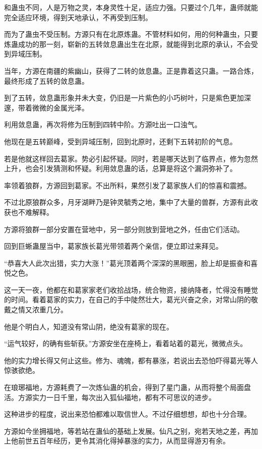 \begin{this_body}
和蛊虫不同，人是万物之灵，本身灵性十足，适应力强。只要过个几年，蛊师就能完全适应环境，得到天地承认，不再受到压制。

而为了蛊虫不受压制。方源只有在北原炼蛊。不管材料如何，用的何种蛊虫，只要炼蛊成功的那一刻，崭新的五转敛息蛊出生在北原，就能得到北原的承认，不会受到异域压制。

当年，方源在南疆的紫幽山，获得了二转的敛息蛊。正是靠着这只蛊。一路合炼，最终形成了五转的敛息蛊。

到了五转，敛息蛊形象并未大变，仍旧是一片紫色的小巧树叶，只是紫色更加深邃，带着微微的金属光泽。

利用敛息蛊，再次将修为压制到四转中阶。方源吐出一口浊气。

他现在是五转巅峰，受到异域压制，回到北原时，还剩下五转初阶的气息。

若是他就这样回去葛家。势必引起怀疑。同时，若是哪天达到了临界点，修为忽然上升，也会引发猜测和怀疑。利用敛息蛊的话，总算是将这个漏洞弥补了。

率领着狼群，方源回到葛家。不出所料，果然引发了葛家族人们的惊喜和震撼。

不过北原狼群众多，月牙湖畔乃是钟灵毓秀之地，集中了大量的兽群，方源有此收获也不难解释。

方源将狼群一部分安置在营地中，另一部分则放到营地之外，任由它们活动。

回到巨蜥蛊屋当中，葛家族长葛光带领着两个亲信，便立即过来拜见。

“恭喜大人此次出猎，实力大涨！”葛光顶着两个深深的黑眼圈，脸上却是振奋和喜悦之色。

这一天一夜，他都在和葛家家老们收拾战场，统合物资，接纳降者，忙得没有睡觉的时间。看着葛家的实力，在自己的手中陡然壮大，葛光兴奋之余，对常山阴的敬戴之情又浓重几分。

他是个明白人，知道没有常山阴，绝没有葛家的现在。

“运气较好，的确有些斩获。”方源安坐在座椅上，看着站着的葛光，微微点头。

他的实力增长得又何止这些。修为、魂魄，都有暴涨，若说出去恐怕吓得葛光等人惊骇欲绝。

在琅琊福地，方源耗费了一次炼仙蛊的机会，得到了星门蛊，从而将整个局面盘活。方源实力一日千里，每次出入狐仙福地，都有不可思议的进步。

这种进步的程度，说出来恐怕都难以取信世人。不过仔细想想，却也十分合理。

方源如今坐拥福地，等若站在蛊仙的基础上发展。仙凡之别，宛若天地之差，再加上他前世五百年经历，更令其消化得掉暴涨的实力，从而显得游刃有余。


\end{this_body}

